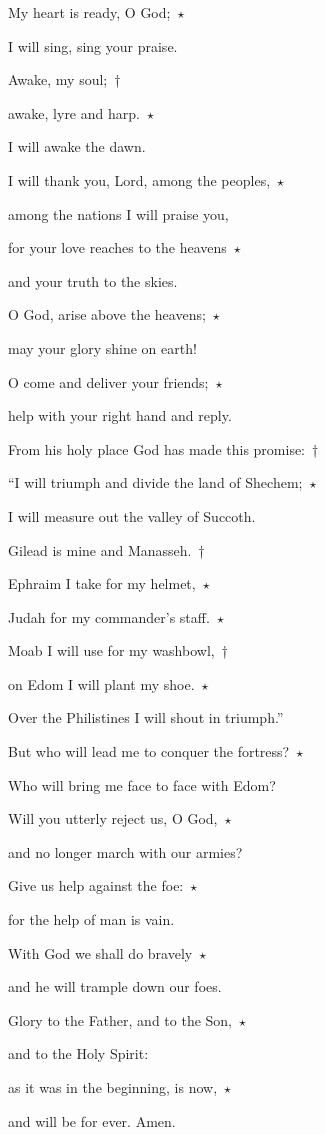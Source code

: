 \noindent My heart is ready, O God;~$\star$~\nopagebreak

I will sing, sing your praise.

\noindent Awake, my soul;~†~\nopagebreak

awake, lyre and harp.~$\star$~\nopagebreak

I will awake the dawn.

\noindent I will thank you, Lord, among the peoples,~$\star$~\nopagebreak

among the nations I will praise you,

\noindent for your love reaches to the heavens~$\star$~\nopagebreak

and your truth to the skies.

\noindent O God, arise above the heavens;~$\star$~\nopagebreak

may your glory shine on earth!

\noindent O come and deliver your friends;~$\star$~\nopagebreak

help with your right hand and reply.

\noindent From his holy place God has made this promise:~†~\nopagebreak

“I will triumph and divide the land of Shechem;~$\star$~\nopagebreak

I will measure out the valley of Succoth.

\noindent Gilead is mine and Manasseh.~†~\nopagebreak

Ephraim I take for my helmet,~$\star$~\nopagebreak

Judah for my commander’s staff.~$\star$~\nopagebreak

\noindent Moab I will use for my washbowl,~†~\nopagebreak

on Edom I will plant my shoe.~$\star$~\nopagebreak

Over the Philistines I will shout in triumph.”

\noindent But who will lead me to conquer the fortress?~$\star$~\nopagebreak

Who will bring me face to face with Edom?

\noindent Will you utterly reject us, O God,~$\star$~\nopagebreak

and no longer march with our armies?

\noindent Give us help against the foe:~$\star$~\nopagebreak

for the help of man is vain.

\noindent With God we shall do bravely~$\star$~\nopagebreak

and he will trample down our foes.

\noindent Glory to the Father, and to the Son,~$\star$~\nopagebreak

and to the Holy Spirit:

\noindent as it was in the beginning, is now,~$\star$~\nopagebreak

and will be for ever. Amen.
